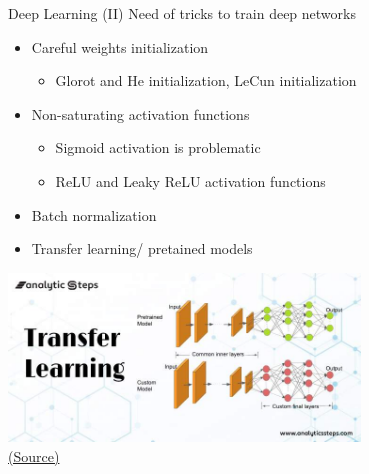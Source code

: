 \documentclass[10pt,compress]{beamer} %
\begin{document}
\begin{frame}{Deep Learning (II)}
	Need of tricks to train deep networks
	\begin{itemize}
		\item Careful weights initialization
			\begin{itemize}
			\item Glorot and He initialization, LeCun initialization
			\end{itemize}
		\item Non-saturating activation functions
			\begin{itemize}
			\item Sigmoid activation is problematic
			\item ReLU and Leaky ReLU activation functions
			\end{itemize}
		\item Batch normalization
		\item Transfer learning/ pretained models
	\end{itemize}
		\centering \includegraphics[width=0.7\textwidth]{figs/transfer.jpg}\\
	\scriptsize\href{https://www.analyticssteps.com/blogs/how-transfer-learning-done-neural-networks-and-convolutional-neural-networks}{(Source)}\\
\end{frame}
\end{document}
